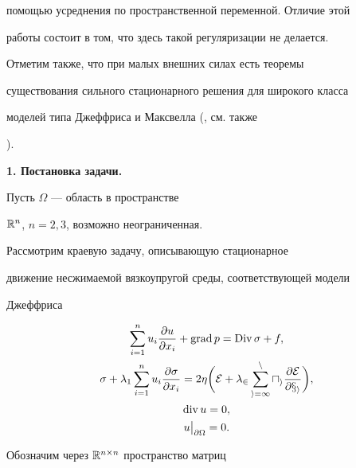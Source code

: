 помощью усреднения по пространственной переменной. Отличие этой


работы состоит в том, что здесь такой регуляризации не делается.


Отметим также, что при малых внешних силах есть теоремы


существования сильного стационарного решения для широкого класса


моделей типа Джеффриса и Максвелла (\cite{ren}, см. также


\cite{gs2}).





\addtocounter{section}{1}


\setcounter{equation}{0}





{\bf 1. Постановка задачи.}


Пусть $\Omega$ --- область в пространстве


$\Bbb{R}^n$, $n=2,3$, возможно неограниченная.





Рассмотрим краевую задачу, описывающую стационарное


движение несжимаемой вязкоупругой среды, соответствующей модели


Джеффриса


\begin{gather}


\sum_{i=1}^{n} u_i\frac{\partial u}{\partial x_i}+\grad p


=\Div \sigma+f,\\


%


\sigma + \lambda_1 \sum_{i=1}^{n} u_i\frac{\partial \sigma}{\partial x_i} =


2\eta\bigg(\cal{E}+\lambda_2\sum\limits_{i=1}^{n} u_i\frac{\partial


\cal{E}}{\partial x_i}\bigg),\\


%


\dv u = 0,\\


u \big|_{\partial\Omega}=0.


\end{gather}





Обозначим через $\Bbb{R}^{n\times n}$  пространство  матриц


